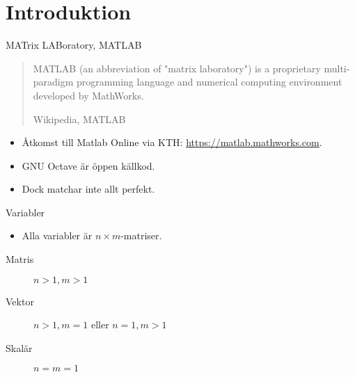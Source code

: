 \mode*

\section{Introduktion}

\begin{frame}
  \begin{block}{MATrix LABoratory, MATLAB}%
    \foreignblockquote{english}[Wikipedia, MATLAB]{MATLAB (an abbreviation of 
    "matrix laboratory") is a proprietary multi-paradigm programming language 
  and numerical computing environment developed by MathWorks.}
  \end{block}
\end{frame}

\begin{frame}
  \begin{remark}[Proprietärt]
    \begin{itemize}
      \item Åtkomst till Matlab Online via KTH: 
        \url{https://matlab.mathworks.com}.

      \item GNU Octave är öppen källkod.
      \item Dock matchar inte allt perfekt.
    \end{itemize}
  \end{remark}
\end{frame}

\begin{frame}
  \begin{block}{Variabler}
    \begin{itemize}
      \item Alla variabler är \(n\times m\)-matriser.
    \end{itemize}
    \begin{description}
      \item[Matris] \(n > 1, m > 1\)
      \item[Vektor] \(n > 1, m = 1\) eller \(n = 1, m > 1\)
      \item[Skalär] \(n = m = 1\)
    \end{description}
  \end{block}
\end{frame}

